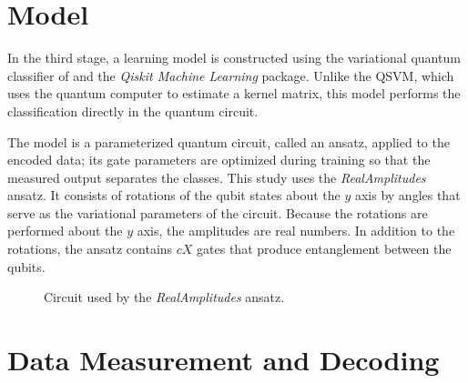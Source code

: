 \section{Model} \label{ansatz}

In the third stage, a learning model is constructed using the variational quantum classifier of  and the \textit{Qiskit Machine Learning} package. Unlike the QSVM, which uses the quantum computer to estimate a kernel matrix, this model performs the classification directly in the quantum circuit.

The model is a parameterized quantum circuit, called an ansatz, applied to the encoded data; its gate parameters are optimized during training so that the measured output separates the classes. This study uses the \textit{RealAmplitudes} ansatz. It consists of rotations of the qubit states about the $y$ axis by angles that serve as the variational parameters of the circuit. Because the rotations are performed about the $y$ axis, the amplitudes are real numbers. In addition to the rotations, the ansatz contains $cX$ gates that produce entanglement between the qubits.

\begin{figure}[H]
\centering
\caption{Circuit used by the \textit{RealAmplitudes} ansatz.}
\label{fig:RealAmplitudes}
\end{figure}

\section{Data Measurement and Decoding}

